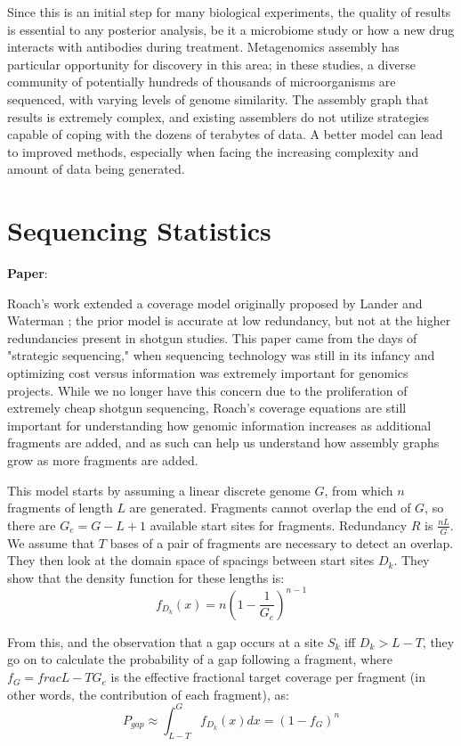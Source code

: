 \documentclass[]{article}
\begin{document}
Since this is an initial step for many biological experiments, the quality of results is 
essential to any posterior analysis, be it a microbiome study or how a new drug interacts 
with antibodies during treatment. Metagenomics assembly has particular opportunity for 
discovery in this area; in these studies, a diverse community of potentially hundreds of 
thousands of microorganisms are sequenced, with varying levels of genome similarity. The 
assembly graph that results is extremely complex, and existing assemblers do not utilize 
strategies capable of coping with the dozens of terabytes of data. A better model can 
lead to improved methods, especially when facing the increasing complexity and amount of 
data being generated.

\section{Sequencing Statistics}

\textbf{Paper}: 

Roach's work extended a coverage model originally proposed by Lander and Waterman 
\cite{lander_genomic_1988}; the prior model is accurate at low redundancy, but not at the 
higher redundancies present in shotgun studies. This paper came from the days of 
"strategic sequencing," when 
sequencing technology was still in its infancy and optimizing cost versus information was 
extremely important for genomics projects. While we no longer have this concern due to 
the proliferation of extremely cheap shotgun sequencing, Roach's coverage equations are 
still important for understanding how genomic information increases as additional 
fragments are added, and as such can help us understand how assembly graphs grow as more 
fragments are added.

This model starts by assuming a linear discrete genome $G$, from which $n$ fragments
of length $L$ are generated. Fragments cannot overlap the end of $G$, so there are
$G_e = G-L+1$ available start sites for fragments. Redundancy $R$ is $\frac{nL}{G}$. We 
assume that $T$ bases of a pair of fragments are necessary to detect an overlap. They 
then look at the domain space of spacings between start sites $D_k$. They show that the 
density  function for these lengths is: $$f_{D_k}(x) = n(1 - \frac{1}{G_e})^{n-1}$$

From this, and the observation that a gap occurs at a site $S_k$ iff $D_k > L - T$, they
go on to calculate the probability of a gap following a fragment, where $f_G = 
frac{L-T}{G_e}$ is the effective fractional target coverage per fragment (in other words, 
the contribution 
of each fragment), as:
$$P_{gap} \approx \int_{L-T}^{G}{f_{D_k}(x)dx}=(1-f_G)^n$$
\end{document}
